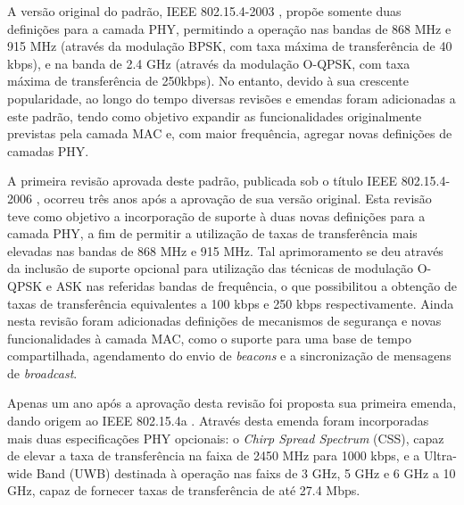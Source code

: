 \documentclass[
	12pt,				%
	openright,			%
	oneside,
	a4paper,			%
	english,			%
	french,				%
	spanish,			%
	brazil				%
	]{abntex2}
\begin{document}
A versão original do padrão, IEEE 802.15.4-2003 \cite{IEEE2003}, propõe somente duas definições para a camada PHY, permitindo a operação nas bandas de 868 MHz e 915 MHz (através da modulação BPSK, com taxa máxima de transferência de 40 kbps), e na banda de 2.4 GHz (através da modulação O-QPSK, com taxa máxima de transferência de 250kbps). No entanto, devido à sua crescente popularidade, ao longo do tempo diversas revisões e emendas foram adicionadas a este padrão, tendo como objetivo expandir as funcionalidades originalmente previstas pela camada MAC e, com maior frequência, agregar novas definições de camadas PHY.

A primeira revisão aprovada deste padrão, publicada sob o título IEEE 802.15.4-2006 \cite{IEEE2006}, ocorreu três anos após a aprovação de sua versão original. Esta revisão teve como objetivo a incorporação de suporte à duas novas definições para a camada PHY, a fim de permitir a utilização de taxas de transferência mais elevadas nas bandas de 868 MHz e 915 MHz. Tal aprimoramento se deu através da inclusão de suporte opcional para utilização das técnicas de modulação O-QPSK e ASK nas referidas bandas de frequência, o que possibilitou a obtenção de taxas de transferência equivalentes a 100 kbps e 250 kbps respectivamente. Ainda nesta revisão foram adicionadas definições de mecanismos de segurança e novas funcionalidades à camada MAC, como o suporte para uma base de tempo compartilhada, agendamento do envio de \textit{beacons} e a sincronização de mensagens de \textit{broadcast}.

Apenas um ano após a aprovação desta revisão foi proposta sua primeira emenda, dando origem ao IEEE 802.15.4a \cite{IEEE2007}. Através desta emenda foram incorporadas mais duas especificações PHY opcionais: o \textit{Chirp Spread Spectrum} (CSS), capaz de elevar a taxa de transferência na faixa de 2450 MHz para 1000 kbps, e a Ultra-wide Band (UWB) destinada à operação nas faixs de 3 GHz, 5 GHz e 6 GHz a 10 GHz, capaz de fornecer taxas de transferência de até 27.4 Mbps.
\end{document}

